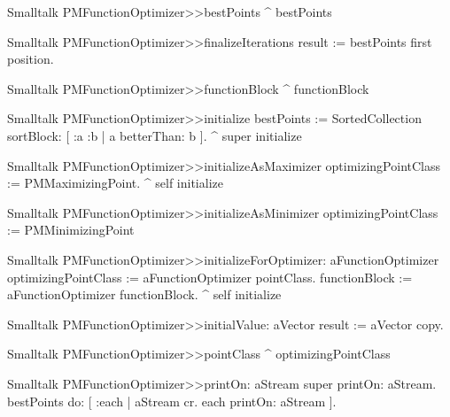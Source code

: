 \begin{displaycode}{Smalltalk}
PMFunctionOptimizer>>bestPoints
   ^ bestPoints
\end{displaycode}

\begin{displaycode}{Smalltalk}
PMFunctionOptimizer>>finalizeIterations
   result := bestPoints first position.
\end{displaycode}

\begin{displaycode}{Smalltalk}
PMFunctionOptimizer>>functionBlock
   ^ functionBlock
\end{displaycode}

\begin{displaycode}{Smalltalk}
PMFunctionOptimizer>>initialize
    bestPoints := SortedCollection sortBlock:
                                         [ :a :b | a betterThan: b ].
    ^ super initialize
\end{displaycode}

\begin{displaycode}{Smalltalk}
PMFunctionOptimizer>>initializeAsMaximizer
    optimizingPointClass := PMMaximizingPoint.
    ^ self initialize
\end{displaycode}

\begin{displaycode}{Smalltalk}
PMFunctionOptimizer>>initializeAsMinimizer
   optimizingPointClass := PMMinimizingPoint
\end{displaycode}

\begin{displaycode}{Smalltalk}
PMFunctionOptimizer>>initializeForOptimizer: aFunctionOptimizer
   optimizingPointClass := aFunctionOptimizer pointClass.
   functionBlock := aFunctionOptimizer functionBlock.
   ^ self initialize
\end{displaycode}

\begin{displaycode}{Smalltalk}
PMFunctionOptimizer>>initialValue: aVector
    result := aVector copy.
\end{displaycode}

\begin{displaycode}{Smalltalk}
PMFunctionOptimizer>>pointClass
    ^ optimizingPointClass
\end{displaycode}

\begin{displaycode}{Smalltalk}
PMFunctionOptimizer>>printOn: aStream
    super printOn: aStream.
    bestPoints do: [ :each | aStream cr. each printOn: aStream ].
\end{displaycode}

